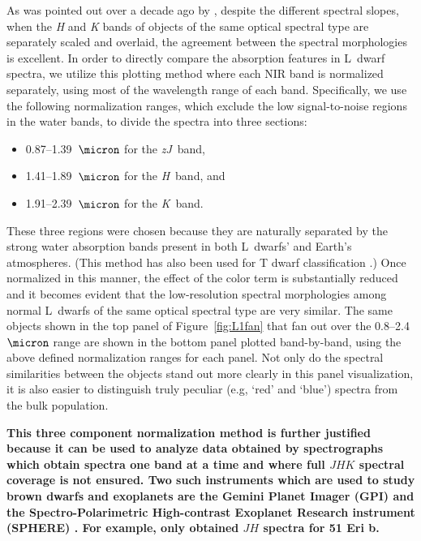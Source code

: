 \documentclass[12pt]{aastex6}
\begin{document}
As was pointed out over a decade ago by \citet{Leggett:2003tm}, despite the different spectral slopes, when the \emph{H} and \emph{K} bands of objects of the same optical spectral type are separately scaled and overlaid, the agreement between the spectral morphologies is excellent.
In order to directly compare the absorption features in L~dwarf spectra, we utilize this plotting method where each NIR band is normalized separately, using most of the wavelength range of each band.
Specifically, we use the following normalization ranges, which exclude the low signal-to-noise regions in the water bands, to divide the spectra into three sections:
\begin{itemize}
\item 0.87--1.39~$\micron$ for the \emph{zJ}~band,
\item 1.41--1.89~$\micron$ for the \emph{H}~band, and
\item 1.91--2.39~$\micron$ for the \emph{K}~band.
\end{itemize}
These three regions were chosen because they are naturally separated by the strong water absorption bands present in both L~dwarfs' and Earth's atmospheres.
(This method has also been used for T dwarf classification \cite{Burgasser06}.)
Once normalized in this manner, the effect of the color term is substantially reduced and it becomes evident that the low-resolution spectral morphologies among normal L~dwarfs of the same optical spectral type are very similar.
The same objects shown in the top panel of Figure~\ref{fig:L1fan} that fan out over the 0.8--2.4~$\micron$ range are shown in the bottom panel plotted band-by-band, using the above defined normalization ranges for each panel.
Not only do the spectral similarities between the objects stand out more clearly in this panel visualization, it is also easier to distinguish truly peculiar (e.g, `red' and `blue') spectra from the bulk population.

\textbf{This three component normalization method is further justified because it can be used to analyze data obtained by spectrographs which obtain spectra one band at a time and where full $JHK$ spectral coverage is not ensured.
Two such instruments which are used to study brown dwarfs and exoplanets are the Gemini Planet Imager (GPI) and the Spectro-Polarimetric High-contrast Exoplanet Research instrument (SPHERE) \citep{Beuzit:2008gt,Macintosh:2014js}.
For example, \citet{Macintosh:2015ew} only obtained $JH$ spectra for 51 Eri b.}
\end{document}
